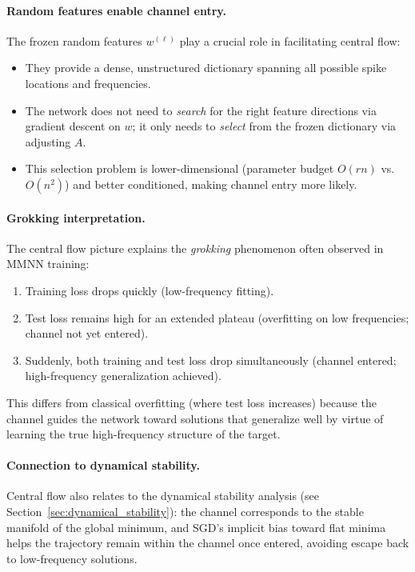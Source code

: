 \documentclass{article}
\begin{document}
\paragraph{Random features enable channel entry.}
The frozen random features \( w^{(\ell)} \) play a crucial role in facilitating central flow:
\begin{itemize}
    \item They provide a dense, unstructured dictionary spanning all possible spike locations and frequencies.
    \item The network does not need to \emph{search} for the right feature directions via gradient descent on \( w \); it only needs to \emph{select} from the frozen dictionary via adjusting \( A \).
    \item This selection problem is lower-dimensional (parameter budget \( O(rn) \) vs. \( O(n^2) \)) and better conditioned, making channel entry more likely.
\end{itemize}

\paragraph{Grokking interpretation.}
The central flow picture explains the \emph{grokking} phenomenon often observed in MMNN training:
\begin{enumerate}
    \item Training loss drops quickly (low-frequency fitting).
    \item Test loss remains high for an extended plateau (overfitting on low frequencies; channel not yet entered).
    \item Suddenly, both training and test loss drop simultaneously (channel entered; high-frequency generalization achieved).
\end{enumerate}
This differs from classical overfitting (where test loss increases) because the channel guides the network toward solutions that generalize well by virtue of learning the true high-frequency structure of the target.

\paragraph{Connection to dynamical stability.}
Central flow also relates to the dynamical stability analysis (see Section~\ref{sec:dynamical_stability}): the channel corresponds to the stable manifold of the global minimum, and SGD's implicit bias toward flat minima helps the trajectory remain within the channel once entered, avoiding escape back to low-frequency solutions.
\end{document}
